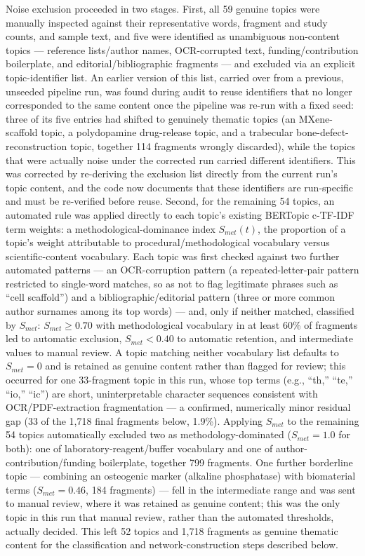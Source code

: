 \documentclass[5p,times,twocolumn]{elsarticle}
\begin{document}
Noise exclusion proceeded in two stages. First, all 59 genuine topics were manually inspected against their representative words, fragment and study counts, and sample text, and five were identified as unambiguous non-content topics --- reference lists/author names, OCR-corrupted text, funding/contribution boilerplate, and editorial/bibliographic fragments --- and excluded via an explicit topic-identifier list. An earlier version of this list, carried over from a previous, unseeded pipeline run, was found during audit to reuse identifiers that no longer corresponded to the same content once the pipeline was re-run with a fixed seed: three of its five entries had shifted to genuinely thematic topics (an MXene-scaffold topic, a polydopamine drug-release topic, and a trabecular bone-defect-reconstruction topic, together 114 fragments wrongly discarded), while the topics that were actually noise under the corrected run carried different identifiers. This was corrected by re-deriving the exclusion list directly from the current run's topic content, and the code now documents that these identifiers are run-specific and must be re-verified before reuse. Second, for the remaining 54 topics, an automated rule was applied directly to each topic's existing BERTopic c-TF-IDF term weights: a methodological-dominance index $S_{met}(t)$, the proportion of a topic's weight attributable to procedural/methodological vocabulary versus scientific-content vocabulary. Each topic was first checked against two further automated patterns --- an OCR-corruption pattern (a repeated-letter-pair pattern restricted to single-word matches, so as not to flag legitimate phrases such as ``cell scaffold'') and a bibliographic/editorial pattern (three or more common author surnames among its top words) --- and, only if neither matched, classified by $S_{met}$: $S_{met} \geq 0.70$ with methodological vocabulary in at least 60\% of fragments led to automatic exclusion, $S_{met} < 0.40$ to automatic retention, and intermediate values to manual review. A topic matching neither vocabulary list defaults to $S_{met}=0$ and is retained as genuine content rather than flagged for review; this occurred for one 33-fragment topic in this run, whose top terms (e.g., ``th,'' ``te,'' ``io,'' ``ic'') are short, uninterpretable character sequences consistent with OCR/PDF-extraction fragmentation --- a confirmed, numerically minor residual gap (33 of the 1,718 final fragments below, 1.9\%). Applying $S_{met}$ to the remaining 54 topics automatically excluded two as methodology-dominated ($S_{met}=1.0$ for both): one of laboratory-reagent/buffer vocabulary and one of author-contribution/funding boilerplate, together 799 fragments. One further borderline topic --- combining an osteogenic marker (alkaline phosphatase) with biomaterial terms ($S_{met}=0.46$, 184 fragments) --- fell in the intermediate range and was sent to manual review, where it was retained as genuine content; this was the only topic in this run that manual review, rather than the automated thresholds, actually decided. This left 52 topics and 1,718 fragments as genuine thematic content for the classification and network-construction steps described below.
\end{document}
